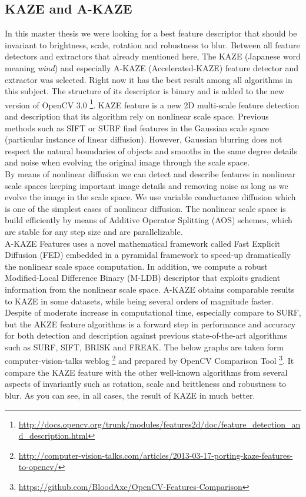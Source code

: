 \subsection {KAZE and A-KAZE}
In this master thesis we were looking for a best feature descriptor that should be invariant to brightness, scale, rotation and robustness to blur. Between all feature detectors and extractors that already mentioned here, The KAZE (Japanese word meaning \emph{wind}) and especially A-KAZE (Accelerated-KAZE) feature detector and extractor was selected. Right now it has the best result among all algorithms in this subject. The structure of its descriptor is binary and is added to the new version of OpenCV 3.0 \footnote{\url{http://docs.opencv.org/trunk/modules/features2d/doc/feature_detection_and_description.html}}.
KAZE \cite{alcantarilla2012kaze} feature is a new 2D multi-scale feature detection and description that its algorithm rely on nonlinear scale space. Previous methods such as SIFT or SURF find features in the Gaussian scale space (particular instance of linear diffusion). However, Gaussian blurring does not respect the natural boundaries of objects and smooths in the same degree details and noise when evolving the original image through the scale space.\\
By means of nonlinear diffusion we can detect and describe features in nonlinear scale spaces keeping important image details and removing noise as long as we evolve the image in the scale space. We use variable conductance diffusion which is one of the simplest cases of nonlinear diffusion. The nonlinear scale space is build efficiently by means of Additive Operator Splitting (AOS) schemes, which are stable for any step size and are parallelizable.\\
A-KAZE \cite{alcantarilla2011fast} Features uses a novel mathematical framework called Fast Explicit Diffusion (FED) embedded in a pyramidal framework to speed-up dramatically the nonlinear scale space computation. In addition, we compute a robust Modified-Local Difference Binary (M-LDB) descriptor that exploits gradient information from the nonlinear scale space. A-KAZE obtains comparable results to KAZE in some datasets, while being several orders of magnitude faster.\\
Despite of moderate increase in computational time, especially compare to SURF, but the AKZE feature algorithms is a forward step in performance and accuracy for both detection and description against previous state-of-the-art algorithms such as SURF, SIFT, BRISK and FREAK.
The below graphs are taken form computer-vision-talks weblog \footnote{\url{http://computer-vision-talks.com/articles/2013-03-17-porting-kaze-features-to-opencv/}} and prepared by OpenCV Comparison Tool \footnote{\url{https://github.com/BloodAxe/OpenCV-Features-Comparison}}. It compare the KAZE feature with the other well-known algorithms from several aspects of invariantly such as rotation, scale and brittleness and robustness to blur. As you can see, in all cases, the result of KAZE in much better.

